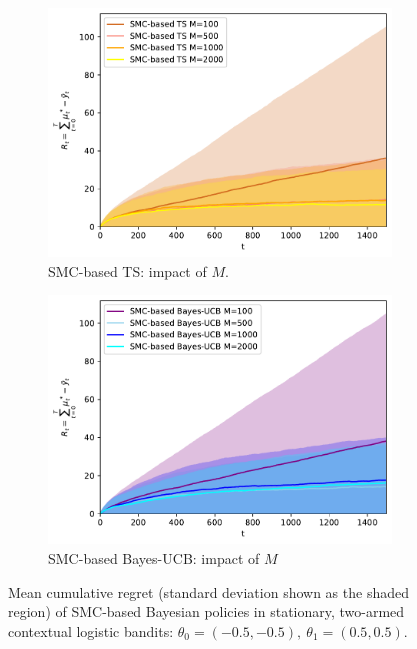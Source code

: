 \begin{figure}[!h]
	\begin{subfigure}[b]{0.46\textwidth}
		\centering
		\includegraphics[width=\textwidth]{./fods_figs/static/logistic/A2/theta-0.5_-0.5_0.5_0.5_allM_cumulative_regret_ts}
		\caption{SMC-based TS: impact of $M$.}
	\end{subfigure}
	\begin{subfigure}[b]{0.46\textwidth}
		\centering
		\includegraphics[width=\textwidth]{./fods_figs/static/logistic/A2/theta-0.5_-0.5_0.5_0.5_allM_cumulative_regret_bucb}
		\caption{SMC-based Bayes-UCB: impact of $M$}
	\end{subfigure}
	
	\caption{Mean cumulative regret (standard deviation shown as the shaded region) of SMC-based Bayesian policies in
		stationary, two-armed contextual logistic bandits:
		$\theta_0=(-0.5,-0.5), \ \theta_1=(0.5,0.5)$.}
\end{figure}

